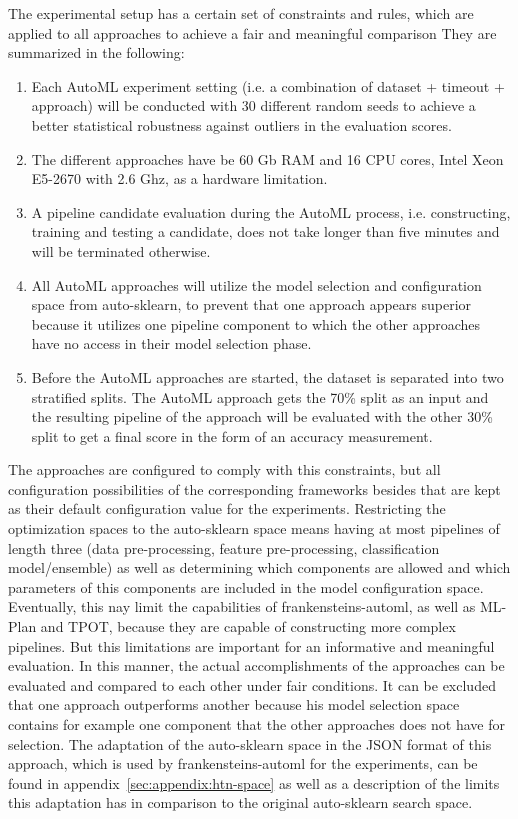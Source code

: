 The experimental setup has a certain set of constraints and rules, which are applied to all approaches to achieve a fair and meaningful comparison
They are summarized in the following:
\begin{enumerate}
    \item Each AutoML experiment setting (i.e. a combination of dataset + timeout + approach) will be conducted with 30 different random seeds to achieve a better statistical robustness against outliers in the evaluation scores.
    \item The different approaches have be 60 Gb RAM and 16 CPU cores, Intel Xeon E5-2670 with 2.6 Ghz, as a hardware limitation.
    \item A pipeline candidate evaluation during the AutoML process, i.e. constructing, training and testing a candidate, does not take longer than five minutes and will be terminated otherwise.
    \item All AutoML approaches will utilize the model selection and configuration space from auto-sklearn, to prevent that one approach appears superior because it utilizes one pipeline component to which the other approaches have no access in their model selection phase.
    \item Before the AutoML approaches are started, the dataset is separated into two stratified splits. The AutoML approach gets the 70\% split as an input and the resulting pipeline of the approach will be evaluated with the other 30\% split to get a final score in the form of an accuracy measurement.
\end{enumerate}
The approaches are configured to comply with this constraints, but all configuration possibilities of the corresponding frameworks besides that are kept as their default configuration value for the experiments.\newline
Restricting the optimization spaces to the auto-sklearn space means having at most pipelines of length three (data pre-processing, feature pre-processing, classification model/ensemble) as well as determining which components are allowed and which parameters of this components are included in the model configuration space.
Eventually, this nay limit the capabilities of frankensteins-automl, as well as ML-Plan and TPOT, because they are capable of constructing more complex pipelines.
But this limitations are important for an informative and meaningful evaluation.\newline
In this manner, the actual accomplishments of the approaches can be evaluated and compared to each other under fair conditions.
It can be excluded that one approach outperforms another because his model selection space contains for example one component that the other approaches does not have for selection.\newline
The adaptation of the auto-sklearn space in the JSON format of this approach, which is used by frankensteins-automl for the experiments, can be found in appendix~\ref{sec:appendix:htn-space} as well as a description of the limits this adaptation has in comparison to the original auto-sklearn search space.

